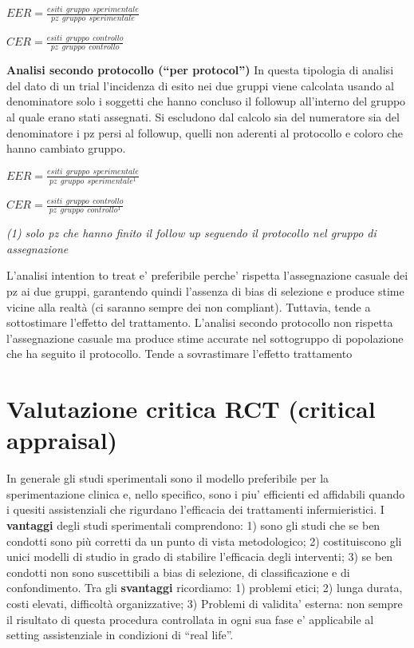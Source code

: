 \documentclass[]{book}
\begin{document}
\(EER = \frac {esiti\ \ gruppo \ \ sperimentale}{pz \ \ gruppo \ \ sperimentale}\)

\(CER = \frac {esiti\ \ gruppo \ \ controllo}{pz \ \ gruppo \ \ controllo}\)

\textbf{Analisi secondo protocollo (``per protocol'')} In questa tipologia di analisi del dato di un trial l'incidenza di esito nei due gruppi viene calcolata usando al denominatore solo i soggetti che hanno concluso il followup all'interno del gruppo al quale erano stati assegnati. Si escludono dal calcolo sia del numeratore sia del denominatore i pz persi al followup, quelli non aderenti al protocollo e coloro che hanno cambiato gruppo.

\(EER = \frac {esiti\ \ gruppo \ \ sperimentale}{pz \ \ gruppo \ \ sperimentale^1}\)

\(CER = \frac {esiti\ \ gruppo \ \ controllo}{pz \ \ gruppo \ \ controllo^1}\)

\emph{(1) solo pz che hanno finito il follow up seguendo il protocollo nel gruppo di assegnazione}

L'analisi intention to treat e' preferibile perche' rispetta l'assegnazione casuale dei pz ai due gruppi, garantendo quindi l'assenza di bias di selezione e produce stime vicine alla realtà (ci saranno sempre dei non compliant). Tuttavia, tende a sottostimare l'effetto del trattamento. L'analisi secondo protocollo non rispetta l'assegnazione casuale ma produce stime accurate nel sottogruppo di popolazione che ha seguito il protocollo. Tende a sovrastimare l'effetto trattamento

\hypertarget{valutazione-critica-rct-critical-appraisal}{%
\section{Valutazione critica RCT (critical appraisal)}\label{valutazione-critica-rct-critical-appraisal}}

In generale gli studi sperimentali sono il modello preferibile per la sperimentazione clinica e, nello specifico, sono i piu' efficienti ed affidabili quando i quesiti assistenziali che rigurdano l'efficacia dei trattamenti infermieristici. I \textbf{vantaggi} degli studi sperimentali comprendono: 1) sono gli studi che se ben condotti sono più corretti da un punto di vista metodologico; 2) costituiscono gli unici modelli di studio in grado di stabilire l'efficacia degli interventi; 3) se ben condotti non sono suscettibili a bias di selezione, di classificazione e di confondimento. Tra gli \textbf{svantaggi} ricordiamo: 1) problemi etici; 2) lunga durata, costi elevati, difficoltà organizzative; 3) Problemi di validita' esterna: non sempre il risultato di questa procedura controllata in ogni sua fase e' applicabile al setting assistenziale in condizioni di ``real life''.
\end{document}
